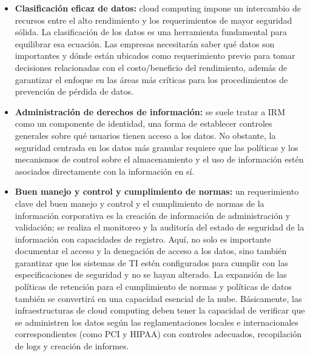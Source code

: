 \documentclass[12pt,a4paper]{article}
\begin{document}
\begin{itemize}
\item \textbf{Clasificación eficaz de datos:} cloud computing impone
un intercambio de recursos entre el alto rendimiento
y los requerimientos de mayor seguridad sólida. La
clasificación de los datos es una herramienta fundamental
para equilibrar esa ecuación. Las empresas necesitarán
saber qué datos son importantes y dónde están ubicados
como requerimiento previo para tomar decisiones
relacionadas con el costo/beneficio del rendimiento,
además de garantizar el enfoque en las áreas más
críticas para los procedimientos de prevención de
pérdida de datos.

\item \textbf{Administración de derechos de información:} se suele
tratar a IRM como un componente de identidad, una
forma de establecer controles generales sobre qué
usuarios tienen acceso a los datos. No obstante, la
seguridad centrada en los datos más granular requiere
que las políticas y los mecanismos de control sobre el
almacenamiento y el uso de información estén asociados
directamente con la información en sí.

\item \textbf{Buen manejo y control y cumplimiento de normas:}
un requerimiento clave del buen manejo y control y el
cumplimiento de normas de la información corporativa
es la creación de información de administración y
validación; se realiza el monitoreo y la auditoría del
estado de seguridad de la información con capacidades
de registro. Aquí, no solo es importante documentar
el acceso y la denegación de acceso a los datos,
sino también garantizar que los sistemas de TI estén
configurados para cumplir con las especificaciones de
seguridad y no se hayan alterado. La expansión de las
políticas de retención para el cumplimiento de normas
y políticas de datos también se convertirá en una
capacidad esencial de la nube. Básicamente, las
infraestructuras de cloud computing deben tener la
capacidad de verificar que se administren los datos
según las reglamentaciones locales e internacionales
correspondientes (como PCI y HIPAA) con controles
adecuados, recopilación de logs y creación de informes.


\end{itemize}
\end{document}
